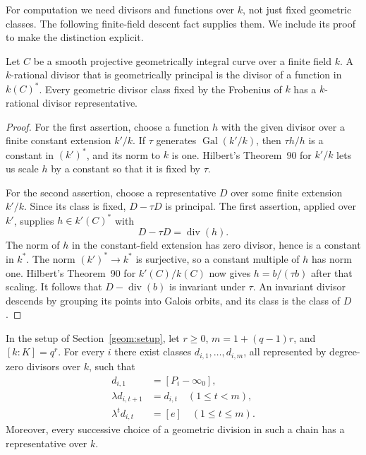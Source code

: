 For computation we need divisors and functions over $k$, not just fixed
geometric classes.  The following finite-field descent fact supplies them.
We include its proof to make the distinction explicit.

\begin{lemma}
\label{geom:descent}
Let $C$ be a smooth projective geometrically integral curve over a finite
field $k$.  A $k$-rational divisor that is geometrically principal is the
divisor of a function in $k(C)^*$.  Every geometric divisor class fixed by
the Frobenius of $k$ has a $k$-rational divisor representative.
\end{lemma}

\begin{proof}
For the first assertion, choose a function $h$ with the given divisor over
a finite constant extension $k'/k$.  If $\tau$ generates
$\operatorname{Gal}(k'/k)$, then $\tau h/h$ is a constant in $(k')^*$,
and its norm to $k$ is one.  Hilbert's Theorem~90 for $k'/k$ lets us
scale $h$ by a constant so that it is fixed by $\tau$.

For the second assertion, choose a representative $D$ over some finite
extension $k'/k$.  Since its class is fixed,
$D-\tau D$ is principal.  The first assertion, applied over $k'$,
supplies $h\in k'(C)^*$ with
\[
                         D-\tau D=\operatorname{div}(h).
\]
The norm of $h$ in the constant-field extension has zero divisor, hence
is a constant in $k^*$.  The norm $(k')^*\to k^*$ is surjective, so a
constant multiple of $h$ has norm one.  Hilbert's Theorem~90 for
$k'(C)/k(C)$ now gives $h=b/(\tau b)$ after that scaling.
It follows that $D-\operatorname{div}(b)$ is invariant under $\tau$.
An invariant divisor descends by grouping its points into Galois orbits,
and its class is the class of $D$.
\end{proof}

\begin{corollary}
\label{geom:lifts}
In the setup of Section~\ref{geom:setup}, let $r\ge0$,
$m=1+(q-1)r$, and $[k:K]=q^r$.
For every $i$ there exist classes $d_{i,1},\ldots,d_{i,m}$, all represented
by degree-zero divisors over $k$, such that
\begin{equation}
 \begin{split}
 d_{i,1}&=[P_i-\infty_0],\\
 \lambda d_{i,t+1}&=d_{i,t}\quad(1\le t<m),\\
 \lambda^t d_{i,t}&=[e]\quad(1\le t\le m).
 \end{split}
\label{geom:lift-chain}
\end{equation}
Moreover, every successive choice of a geometric division in such a chain
has a representative over $k$.
\end{corollary}


